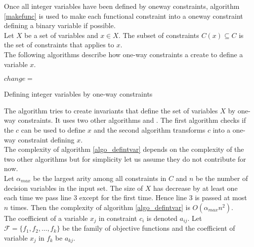 Once all integer variables 
have been defined by oneway constraints, algorithm \ref{makefunc} is used to make each functional constraint into a 
oneway constraint defining a binary variable if possible. \\ 





Let $X$ be a set of variables and $x \in X$. The subset of constraints $C(x) \subseteq C$ is the set 
of constraints that applies to $x$.\\ 
The following algorithms describe how one-way constraints a create to define a variable $x$. \\ 



\IncMargin{1em}
\begin{algorithm}[H]

\algdata 
{}
\BlankLine
\Bool $change = $ \true\;
\caption{Defining integer variables by one-way constraints}\label{makefunc}
\end{algorithm}\DecMargin{1em}
\noindent
The algorithm tries to create invariants that define the set of variables $X$ by one-way constraints. It uses two other 
algorithms  and . The first algorithm checks if the \cons $c$ can be used to define 
\var $x$ and the second algorithm transforms $c$ into a one-way constraint defining $x$. \\ 
The complexity of algorithm \ref{algo_defintvar} depends on the complexity of the two other algorithms but for 
simplicity let us assume they do not contribute for now. \\ 
Let $\alpha_{max}$ be the largest arity among all constraints in $C$ and $n$ be the number of decision variables in the 
input set. The size of $X$ has decrease by at least one each time we pass line 3 except for the first time. Hence line 3 
is passed at most $n$ times. Then the complexity of algorithm \ref{algo_defintvar} is $O(\alpha_{max} n^2)$. \\ \medskip
The coefficient of a variable $x_j$ in constraint $c_i$ is denoted $a_{ij}$. Let $\mathcal{F} = \{f_1,f_2,\dots ,f_k\}$ 
be the family of objective functions  and the coefficient of variable $x_j$ 
in $f_k$ be $a_{kj}$.  \\  

